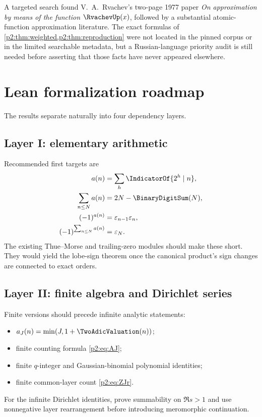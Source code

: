 \documentclass[11pt]{article}
\numberwithin{equation}{section}
\theoremstyle{definition}
\theoremstyle{remark}
\begin{document}
\begin{warning}
A targeted search found V.~A.~Rvachev's two-page 1977 paper \emph{On approximation
by means of the function $\RvachevUp(x)$}, followed by a substantial atomic-function
approximation literature.  The exact formulas of \cref{p2:thm:weighted,p2:thm:reproduction}
were not located in the pinned corpus or in the limited searchable metadata, but
a Russian-language priority audit is still needed before asserting that those
facts have never appeared elsewhere.
\end{warning}

\section{Lean formalization roadmap}
\label{p2:sec:lean}

The results separate naturally into four dependency layers.

\subsection{Layer I: elementary arithmetic}

Recommended first targets are
\begin{align*}
 a(n)&=\sum_h\IndicatorOf{2^h\mid n},\\
 \sum_{n\le N}a(n)&=2N-\BinaryDigitSum(N),\\
 (-1)^{a(n)}&=\varepsilon_{n-1}\varepsilon_n,\\
 (-1)^{\sum_{n\le N}a(n)}&=\varepsilon_N.
\end{align*}
The existing Thue--Morse and trailing-zero modules should make these short.
They would yield the lobe-sign theorem once the canonical product's sign changes
are connected to exact orders.

\subsection{Layer II: finite algebra and Dirichlet series}

Finite versions should precede infinite analytic statements:
\begin{itemize}
\item $a_J(n)=\min(J,1+\TwoAdicValuation(n))$;
\item finite counting formula \eqref{p2:eq:AJ};
\item finite $q$-integer and Gaussian-binomial polynomial identities;
\item finite common-layer count \eqref{p2:eq:ZJr}.
\end{itemize}
For the infinite Dirichlet identities, prove summability on $\Re s>1$ and use
nonnegative layer rearrangement before introducing meromorphic continuation.
\end{document}
